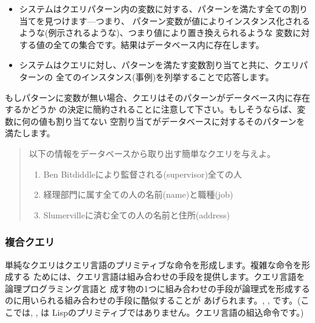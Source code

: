 \begin{itemize}

\item
システムはクエリパターン内の変数に対する、パターンを満たす全ての割り当てを見つけます---つまり、
パターン変数が値によりインスタンス化されるような(例示されるような)、つまり値により置き換えられるような
変数に対する値の全ての集合です。結果はデータベース内に存在します。

\item
システムはクエリに対し、パターンを満たす変数割り当てと共に、クエリパターンの
全てのインスタンス(事例)を列挙することで応答します。

\end{itemize}

\noindent
もしパターンに変数が無い場合、クエリはそのパターンがデータベース内に存在するかどうか
の決定に簡約されることに注意して下さい。もしそうならば、変数に何の値も割り当てない
空割り当てがデータベースに対するそのパターンを満たします。

\begin{quote}
以下の情報をデータベースから取り出す簡単なクエリを与えよ。

\begin{enumerate}

\item
Ben Bitdiddleにより監督される(supervisor)全ての人

\item
経理部門に属す全ての人の名前(name)と職種(job)

\item
Slumervilleに済む全ての人の名前と住所(address)

\end{enumerate}
\end{quote}

\subsubsection*{複合クエリ}


単純なクエリはクエリ言語のプリミティブな命令を形成します。複雑な命令を形成する
ためには、クエリ言語は組み合わせの手段を提供します。クエリ言語を論理プログラミング言語と
成す物の1つに組み合わせの手段が論理式を形成するのに用いられる組み合わせの手段に酷似することが
あげられます。, , です。(ここでは, , は
Lispのプリミティブではありません。クエリ言語の組込命令です。)

